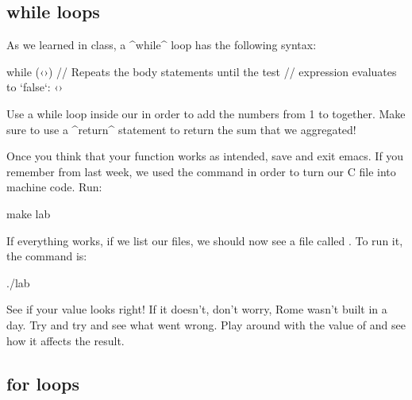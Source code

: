 \documentclass{tufte-handout}
\begin{document}
\subsection{{\codeKeywordstyle while} loops} As we learned in class, a  ^while^
loop has the following syntax:

\begin{Code}
    while (‹›) {
        // Repeats the body statements until the test
        // expression evaluates to `false`:
        ‹›
    }
\end{Code}


Use a while loop inside our  in order to
add the numbers from 1 to  together. Make sure to
use a ^return^ statement to return the sum that we aggregated!

Once you think that your function works as intended, save and exit
emacs. If you remember from last week, we used the 
command in order to turn our C file into machine code. Run:

\begin{CmdLine*}
  \C make lab\\
\end{CmdLine*}

If everything works, if we list our files, we should now see a file
called . To run it, the command is:

\begin{CmdLine*}
  \C ./lab\\
\end{CmdLine*}

See if your value looks right!  If it doesn't, don't worry, Rome wasn't
built in a day.  Try and try and see what went wrong.  Play around with the value of  and see
how it affects the result.

\subsection{{\codeKeywordstyle for} loops}
\end{document}

